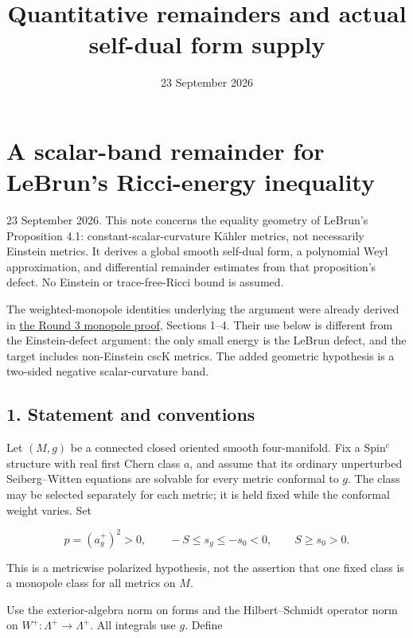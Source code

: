\documentclass[
  11pt,
]{article}
\title{Quantitative remainders and actual self-dual form supply}
\author{}
\date{23 September 2026}
\begin{document}
\maketitle

\hypertarget{a-scalar-band-remainder-for-lebruns-ricci-energy-inequality}{%
\section{A scalar-band remainder for LeBrun's Ricci-energy
inequality}\label{a-scalar-band-remainder-for-lebruns-ricci-energy-inequality}}

23 September 2026. This note concerns the equality geometry of LeBrun's
Proposition 4.1: constant-scalar-curvature Kähler metrics, not
necessarily Einstein metrics. It derives a global smooth self-dual form,
a polynomial Weyl approximation, and differential remainder estimates
from that proposition's defect. No Einstein or trace-free-Ricci bound is
assumed.

The weighted-monopole identities underlying the argument were already
derived in \href{round3_monopole_input.md}{the Round 3 monopole proof},
Sections 1--4. Their use below is different from the Einstein-defect
argument: the only small energy is the LeBrun defect, and the target
includes non-Einstein cscK metrics. The added geometric hypothesis is a
two-sided negative scalar-curvature band.

\hypertarget{statement-and-conventions}{%
\subsection{1. Statement and
conventions}\label{statement-and-conventions}}

Let \((M,g)\) be a connected closed oriented smooth four-manifold. Fix a
Spin\(^c\) structure with real first Chern class \(a\), and assume that
its ordinary unperturbed Seiberg--Witten equations are solvable for
every metric conformal to \(g\). The class may be selected separately
for each metric; it is held fixed while the conformal weight varies. Set

\[
 p=(a_g^+)^2>0,
 \qquad -S\le s_g\le-s_0<0,
 \qquad S\ge s_0>0.
 \tag{1}
\]

This is a metricwise polarized hypothesis, not the assertion that one
fixed class is a monopole class for all metrics on \(M\).

Use the exterior-algebra norm on forms and the Hilbert--Schmidt operator
norm on \(W^+:\Lambda^+\to\Lambda^+\). All integrals use \(g\). Define
\end{document}
